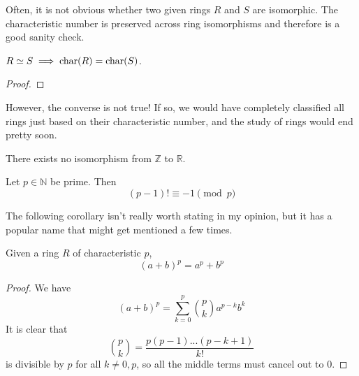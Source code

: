   Often, it is not obvious whether two given rings $R$ and $S$ are isomorphic. The characteristic number is preserved across ring isomorphisms and therefore is a good sanity check. 

  \begin{theorem}
    $R \simeq S \implies \Char(R) = \Char(S)$. 
  \end{theorem}
  \begin{proof}

  \end{proof}

  However, the converse is not true! If so, we would have completely classified all rings just based on their characteristic number, and the study of rings would end pretty soon. 

  \begin{example}
    There exists no isomorphism from $\mathbb{Z}$ to $\mathbb{R}$. 
  \end{example}

  \begin{theorem}
    Let $p \in \mathbb{N}$ be prime. Then 
    \begin{equation}
      (p-1)! \equiv -1 \pmod{p}
    \end{equation}
  \end{theorem}
  
  The following corollary isn't really worth stating in my opinion, but it has a popular name that might get mentioned a few times. 

  \begin{corollary}
    Given a ring $R$ of characteristic $p$, 
    \begin{equation}
      (a + b)^p = a^p + b^p
    \end{equation}
  \end{corollary}
  \begin{proof}
    We have 
    \begin{equation}
      (a + b)^p = \sum_{k = 0}^p \binom{p}{k} a^{p-k} b^{k}
    \end{equation}
    It is clear that 
    \begin{equation}
      \binom{p}{k} = \frac{p (p-1) ... (p - k+1)}{k!}
    \end{equation}
    is divisible by $p$ for all $k \neq 0, p$, so all the middle terms must cancel out to $0$. 
  \end{proof}

